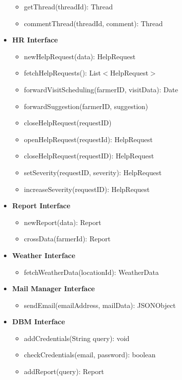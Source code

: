 \documentclass[10pt]{article} %
\begin{document}
\begin{itemize}
\begin{itemize}
        \item getThread(threadId): Thread 
        \item commentThread(threadId, comment): Thread
    \end{itemize}
    \item \textbf{HR Interface}
    \begin{itemize}
        \item newHelpRequest(data): HelpRequest
        \item fetchHelpRequests(): List$<$HelpRequest$>$
        \item forwardVisitScheduling(farmerID, visitData): Date
        \item forwardSuggestion(farmerID, suggestion)
        \item closeHelpRequest(requestID)
        \item openHelpRequest(requestId): HelpRequest
        \item closeHelpRequest(requestID): HelpRequest
        \item setSeverity(requestID, severity): HelpRequest
        \item increaseSeverity(requestID): HelpRequest
    \end{itemize}
    \item \textbf{Report Interface}
    \begin{itemize}
        \item newReport(data): Report
        \item crossData(farmerId): Report
    \end{itemize}
    \item \textbf{Weather Interface}
    \begin{itemize}
        \item fetchWeatherData(locationId): WeatherData
    \end{itemize}
    \item \textbf{Mail Manager Interface}
    \begin{itemize}
        \item sendEmail(emailAddress, mailData): JSONObject
    \end{itemize}
    \item \textbf{DBM Interface}
    \begin{itemize}
        \item addCredentials(String query): void
        \item checkCredentials(email, password): boolean
        \item addReport(query): Report

\end{itemize}
\end{itemize}
\end{document}
